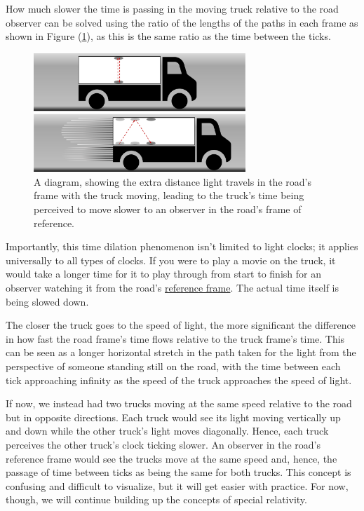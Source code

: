 How much slower the time is passing in the moving truck relative to the road observer can be solved using the ratio of the lengths of the paths in each frame as shown in Figure (\ref{fig: truck clock}), as this is the same ratio as the time between the ticks.

\begin{figure}[H]
	\centering
	\includegraphics[width = 8cm]{images/pdf/lorry_clock.pdf}
	\caption{A diagram, showing the extra distance light travels in the road's frame with the truck moving, leading to the truck's time being perceived to move slower to an observer in the road's frame of reference.}
	\label{fig: truck clock}
\end{figure}

Importantly, this time dilation phenomenon isn't limited to light clocks; it applies universally to all types of clocks.
If you were to play a movie on the truck, it would take a longer time for it to play through from start to finish for an observer watching it from the road's \hyperlink{def-Reference-frame}{reference frame}.
The actual time itself is being slowed down.

The closer the truck goes to the speed of light, the more significant the difference in how fast the road frame's time flows relative to the truck frame's time.
This can be seen as a longer horizontal stretch in the path taken for the light from the perspective of someone standing still on the road, with the time between each tick approaching infinity as the speed of the truck approaches the speed of light.

If now, we instead had two trucks moving at the same speed relative to the road but in opposite directions.
Each truck would see its light moving vertically up and down while the other truck's light moves diagonally.
Hence, each truck perceives the other truck's clock ticking slower.
An observer in the road's reference frame would see the trucks move at the same speed and, hence, the passage of time between ticks as being the same for both trucks.
This concept is confusing and difficult to visualize, but it will get easier with practice.
For now, though, we will continue building up the concepts of special relativity.

